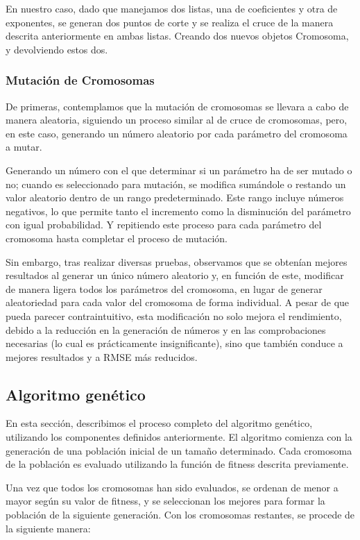 \documentclass[conference,a4paper]{IEEEtran}
\begin{document}
En nuestro caso, dado que manejamos dos listas, una de coeficientes y otra de exponentes, se generan dos puntos de corte y se realiza el cruce de la manera descrita anteriormente en ambas listas. Creando dos nuevos objetos Cromosoma, y devolviendo estos dos.



\subsubsection{Mutación de Cromosomas}
De primeras, contemplamos que la mutación de cromosomas se llevara a cabo de manera aleatoria, siguiendo un proceso similar al de cruce de cromosomas, pero, en este caso, generando un número aleatorio por cada parámetro del cromosoma a mutar.


Generando un número con el que determinar si un parámetro ha de ser mutado o no; cuando es seleccionado para mutación, se modifica sumándole o restando un valor aleatorio dentro de un rango predeterminado. Este rango incluye números negativos, lo que permite tanto el incremento como la disminución del parámetro con igual probabilidad. Y repitiendo este proceso para cada parámetro del cromosoma hasta completar el proceso de mutación.

Sin embargo, tras realizar diversas pruebas, observamos que se obtenían mejores resultados al generar un único número aleatorio y, en función de este, modificar de manera ligera todos los parámetros del cromosoma, en lugar de generar aleatoriedad para cada valor del cromosoma de forma individual. A pesar de que pueda parecer contraintuitivo, esta modificación no solo mejora el rendimiento, debido a la reducción en la generación de números y en las comprobaciones necesarias (lo cual es prácticamente insignificante), sino que también conduce a mejores resultados y a RMSE más reducidos.


\subsection{Algoritmo genético}
En esta sección, describimos el proceso completo del algoritmo genético, utilizando los componentes definidos anteriormente. El algoritmo comienza con la generación de una población inicial de un tamaño determinado. Cada cromosoma de la población es evaluado utilizando la función de fitness descrita previamente.

Una vez que todos los cromosomas han sido evaluados, se ordenan de menor a mayor según su valor de fitness, y se seleccionan los mejores para formar la población de la siguiente generación. Con los cromosomas restantes, se procede de la siguiente manera:
\end{document}
